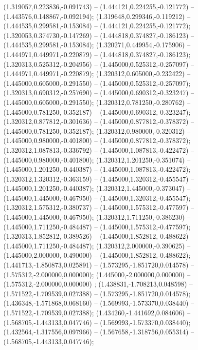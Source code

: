  (1.319057,0.223836,-0.091743) -- (1.444121,0.224255,-0.121772) -- (1.443576,0.148867,-0.092194);
 (1.319648,0.299346,-0.119212) -- (1.444535,0.299581,-0.153084) -- (1.444121,0.224255,-0.121772);
 (1.320053,0.374730,-0.147269) -- (1.444818,0.374827,-0.186123) -- (1.444535,0.299581,-0.153084);
 (1.320271,0.449954,-0.175906) -- (1.444971,0.449971,-0.220879) -- (1.444818,0.374827,-0.186123);
 (1.320313,0.525312,-0.204956) -- (1.445000,0.525312,-0.257097) -- (1.444971,0.449971,-0.220879);
 (1.320312,0.605000,-0.232422) -- (1.445000,0.605000,-0.291550) -- (1.445000,0.525312,-0.257097);
 (1.320313,0.690312,-0.257690) -- (1.445000,0.690312,-0.323247) -- (1.445000,0.605000,-0.291550);
 (1.320312,0.781250,-0.280762) -- (1.445000,0.781250,-0.352187) -- (1.445000,0.690312,-0.323247);
 (1.320312,0.877812,-0.301636) -- (1.445000,0.877812,-0.378372) -- (1.445000,0.781250,-0.352187);
 (1.320312,0.980000,-0.320312) -- (1.445000,0.980000,-0.401800) -- (1.445000,0.877812,-0.378372);
 (1.320312,1.087813,-0.336792) -- (1.445000,1.087813,-0.422472) -- (1.445000,0.980000,-0.401800);
 (1.320312,1.201250,-0.351074) -- (1.445000,1.201250,-0.440387) -- (1.445000,1.087813,-0.422472);
 (1.320312,1.320312,-0.363159) -- (1.445000,1.320312,-0.455547) -- (1.445000,1.201250,-0.440387);
 (1.320312,1.445000,-0.373047) -- (1.445000,1.445000,-0.467950) -- (1.445000,1.320312,-0.455547);
 (1.320312,1.575312,-0.380737) -- (1.445000,1.575312,-0.477597) -- (1.445000,1.445000,-0.467950);
 (1.320312,1.711250,-0.386230) -- (1.445000,1.711250,-0.484487) -- (1.445000,1.575312,-0.477597);
 (1.320313,1.852812,-0.389526) -- (1.445000,1.852812,-0.488622) -- (1.445000,1.711250,-0.484487);
 (1.320312,2.000000,-0.390625) -- (1.445000,2.000000,-0.490000) -- (1.445000,1.852812,-0.488622);
 (1.441713,-1.850873,0.025891) -- (1.573295,-1.851720,0.014578) -- (1.575312,-2.000000,0.000000);
 (1.445000,-2.000000,0.000000) -- (1.575312,-2.000000,0.000000) ;
 (1.438831,-1.708213,0.048598) -- (1.571522,-1.709539,0.027388) -- (1.573295,-1.851720,0.014578);
 (1.436348,-1.571868,0.068160) -- (1.569993,-1.573370,0.038440) -- (1.571522,-1.709539,0.027388);
 (1.434260,-1.441692,0.084606) -- (1.568705,-1.443133,0.047746) -- (1.569993,-1.573370,0.038440);
 (1.432564,-1.317556,0.097966) -- (1.567658,-1.318756,0.055314) -- (1.568705,-1.443133,0.047746);
